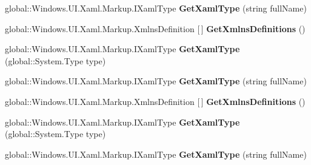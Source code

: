 \begin{DoxyCompactItemize}
global\+::\+Windows.\+U\+I.\+Xaml.\+Markup.\+I\+Xaml\+Type {\bfseries Get\+Xaml\+Type} (string full\+Name)
\item 
\mbox{\label{interface_windows_1_1_u_i_1_1_xaml_1_1_markup_1_1_i_xaml_metadata_provider_a8ae18d0fbda9e17c4168690ffc4d81ee}} 
global\+::\+Windows.\+U\+I.\+Xaml.\+Markup.\+Xmlns\+Definition \mbox{[}$\,$\mbox{]} {\bfseries Get\+Xmlns\+Definitions} ()
\item 
\mbox{\label{interface_windows_1_1_u_i_1_1_xaml_1_1_markup_1_1_i_xaml_metadata_provider_a377ff409aeef7809629e89922b5c7c04}} 
global\+::\+Windows.\+U\+I.\+Xaml.\+Markup.\+I\+Xaml\+Type {\bfseries Get\+Xaml\+Type} (global\+::\+System.\+Type type)
\item 
\mbox{\label{interface_windows_1_1_u_i_1_1_xaml_1_1_markup_1_1_i_xaml_metadata_provider_ae30d4bd18a8682dafecc626a2d444d1f}} 
global\+::\+Windows.\+U\+I.\+Xaml.\+Markup.\+I\+Xaml\+Type {\bfseries Get\+Xaml\+Type} (string full\+Name)
\item 
\mbox{\label{interface_windows_1_1_u_i_1_1_xaml_1_1_markup_1_1_i_xaml_metadata_provider_a8ae18d0fbda9e17c4168690ffc4d81ee}} 
global\+::\+Windows.\+U\+I.\+Xaml.\+Markup.\+Xmlns\+Definition \mbox{[}$\,$\mbox{]} {\bfseries Get\+Xmlns\+Definitions} ()
\item 
\mbox{\label{interface_windows_1_1_u_i_1_1_xaml_1_1_markup_1_1_i_xaml_metadata_provider_a377ff409aeef7809629e89922b5c7c04}} 
global\+::\+Windows.\+U\+I.\+Xaml.\+Markup.\+I\+Xaml\+Type {\bfseries Get\+Xaml\+Type} (global\+::\+System.\+Type type)
\item 
\mbox{\label{interface_windows_1_1_u_i_1_1_xaml_1_1_markup_1_1_i_xaml_metadata_provider_ae30d4bd18a8682dafecc626a2d444d1f}} 
global\+::\+Windows.\+U\+I.\+Xaml.\+Markup.\+I\+Xaml\+Type {\bfseries Get\+Xaml\+Type} (string full\+Name)
\item 

\end{DoxyCompactItemize}
